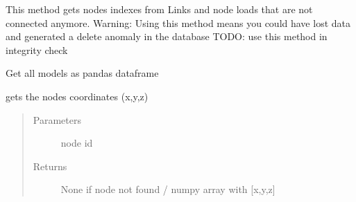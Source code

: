 \documentclass[letterpaper,10pt,english]{sphinxmanual}
\begin{document}
\begin{fulllineitems}
\begin{fulllineitems}
\end{fulllineitems}


\begin{fulllineitems}
\label{\detokenize{api:beamon.database.database.Database.get_lost_dependencies}}
This method gets nodes indexes from Links and node loads that are not connected anymore.
Warning: Using this method means you could have lost data and generated a delete anomaly in the database
TODO: use this method in integrity check

\end{fulllineitems}


\begin{fulllineitems}
\label{\detokenize{api:beamon.database.database.Database.get_models}}
Get all models as pandas dataframe

\end{fulllineitems}


\begin{fulllineitems}
\label{\detokenize{api:beamon.database.database.Database.get_node}}
gets the nodes coordinates (x,y,z)
\begin{quote}\begin{description}
\item[{Parameters}] \leavevmode
{} \textendash{} node id

\item[{Returns}] \leavevmode
None if node not found / numpy array with {[}x,y,z{]}

\end{description}\end{quote}


\end{fulllineitems}
\end{fulllineitems}
\end{document}

